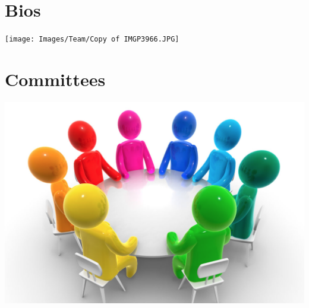 \documentclass[
letterpaper, %
11pt, %
twoside,
onecolumn, %
openright, %
]{report}
\begin{document}
\chapter{Bios}
\vspace{3em}
\begin{minipage}[c]{\linewidth}
\centering
\texttt{[image: Images/Team/Copy of IMGP3966.JPG]}
\end{minipage}
























                                            
\chapter{Committees} 
\vspace{3em}
\begin{minipage}[c]{\linewidth}
\centering
\includegraphics[width=\linewidth]{Committees/committee.png}
\end{minipage}
\end{document}
